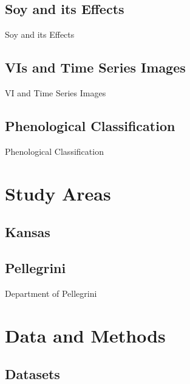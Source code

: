\documentclass[compress]{beamer}
\begin{document}
\subsection{Soy and its Effects}
\begin{frame}{Soy and its Effects}
	
\end{frame}


\subsection{VIs and Time Series Images}
\begin{frame}{VI and Time Series Images}
	
\end{frame}


\subsection{Phenological Classification}
\begin{frame}{Phenological Classification}
	
\end{frame}


\section{Study Areas}

\subsection{Kansas}
\begin{frame}{}
	
\end{frame}


\subsection{Pellegrini}
\begin{frame}{Department of Pellegrini}
	
\end{frame}


\section{Data and Methods}

\subsection{Datasets}
\end{document}
